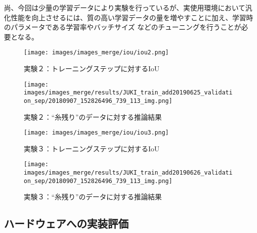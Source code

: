 尚、今回は少量の学習データにより実験を行っているが、実使用環境において汎化性能を向上させるには、質の高い学習データの量を増やすことに加え、学習時のパラメータである学習率やバッチサイズ などのチューニングを行うことが必要となる。

\begin{figure}[htbp]
\begin{minipage}{0.5\hsize}
\begin{center}
\texttt{[image: images/images\_merge/iou/iou2.png]}
\end{center}
\caption{実験２：トレーニングステップに対するIoU}
\label{fig:iou1}
\end{minipage}
\begin{minipage}{0.5\hsize}
\begin{center}
\texttt{[image: images/images\_merge/results/JUKI\_train\_add20190625\_validation\_sep/20180907\_152826496\_739\_113\_img.png]}
\end{center}
\caption{実験２：“糸残り”のデータに対する推論結果}
\label{fig:nokori1}
\end{minipage}
\end{figure} 

\begin{figure}[htbp]
\begin{minipage}{0.5\hsize}
\begin{center}
\texttt{[image: images/images\_merge/iou/iou3.png]}
\end{center}
\caption{実験３：トレーニングステップに対するIoU}
\label{fig:iou1}
\end{minipage}
\begin{minipage}{0.5\hsize}
\begin{center}
\texttt{[image: images/images\_merge/results/JUKI\_train\_add20190626\_validation\_sep/20180907\_152826496\_739\_113\_img.png]}
\end{center}
\caption{実験３：“糸残り”のデータに対する推論結果}
\label{fig:nokori1}
\end{minipage}
\end{figure} 

\newpage


\subsection{ハードウェアへの実装評価}

